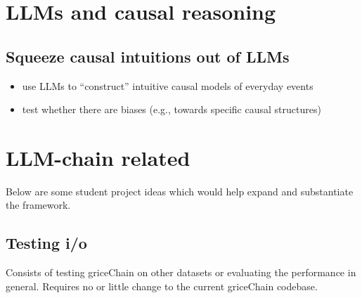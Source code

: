 \documentclass[fleqn,reqno,10pt]{article}
\begin{document}
\section{LLMs and causal reasoning}

\subsection{Squeeze causal intuitions out of LLMs}

\begin{itemize}
  \item use LLMs to ``construct'' intuitive causal models of everyday events
  \item test whether there are biases (e.g., towards specific causal structures)
\end{itemize}

\section{LLM-chain related}

Below are some student project ideas which would help expand and substantiate the framework.

\subsection{Testing i/o}

Consists of testing griceChain on other datasets or evaluating the performance in general. Requires no or little change to the current griceChain codebase.
\end{document}
